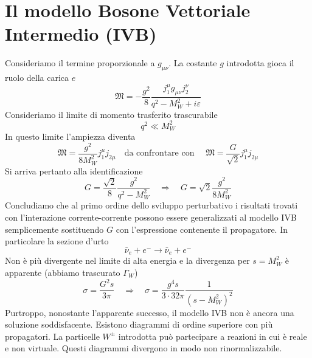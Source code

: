 \section{Il modello Bosone Vettoriale Intermedio (IVB)}
Consideriamo il termine proporzionale a $g_{\mu\nu}$. La costante $g$ introdotta gioca il ruolo della carica $e$
$$
\mathfrak{M} = -\frac{g^2}{8} \frac{j_1^\mu g_{\mu\nu} j_2^\nu}{q^2 - M_W^2 + i\varepsilon}
$$
Consideriamo il limite di momento trasferito trascurabile
$$
q^2 \ll M_W^2
$$
In questo limite l'ampiezza diventa
$$
\mathfrak{M} = \frac{g^2}{8M_W^2} j_1^\mu j_{2\mu} \quad \text{da confrontare con }\quad \mathfrak{M} = \frac{G}{\sqrt{2}} j_1^\mu j_{2\mu}
$$
Si arriva pertanto alla identificazione
$$
G = \frac{\sqrt{2}}{8} \frac{g^2}{q^2 - M_W^2} \quad \Rightarrow \quad G = \sqrt{2} \frac{g^2}{8M_W^2}
$$
Concludiamo che al primo ordine dello sviluppo perturbativo i risultati trovati con l'interazione corrente-corrente possono essere generalizzati al modello IVB semplicemente sostituendo $G$ con l'espressione contenente il propagatore. In particolare la sezione d'urto
$$
\bar{\nu}_e + e^- \to \bar{\nu}_e + e^-
$$
Non è più divergente nel limite di alta energia e la divergenza per $s=M_W^2$ è apparente (abbiamo trascurato $\Gamma_W$)
$$
\sigma = \frac{G^2s}{3\pi} \quad \Rightarrow \quad \sigma = \frac{g^4s}{3 \cdot 32\pi} \frac{1}{(s - M_W^2)^2}
$$
Purtroppo, nonostante l'apparente successo, il modello IVB non è ancora una soluzione soddisfacente. Esistono diagrammi di ordine superiore con più propagatori. La particelle $W^{\pm}$ introdotta può partecipare a reazioni in cui è reale e non virtuale. Questi diagrammi divergono in modo non rinormalizzabile.